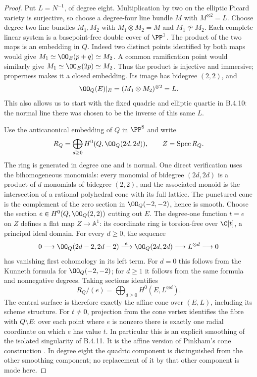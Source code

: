 \begin{proof}
Put $L=N^{-1}$, of degree eight.  Multiplication by two on the
elliptic Picard variety is surjective, so choose a degree-four
line bundle $M$ with $M^{\otimes2}=L$.
Choose degree-two line bundles $M_1,M_2$ with
$M_1\otimes M_2=M$ and $M_1\not\simeq M_2$.
Each complete linear system is a basepoint-free double cover of
$\PP^1$.  The product of the two maps is an embedding in $Q$.
Indeed two distinct points identified by both maps would give
$M_1\simeq\OO_E(p+q)\simeq M_2$.
A common ramification point would similarly give
$M_1\simeq\OO_E(2p)\simeq M_2$.
Thus the product is injective and immersive; properness makes it a
closed embedding.  Its image has bidegree $(2,2)$, and
\[
 \OO_Q(E)|_E=(M_1\otimes M_2)^{\otimes2}=L.
\]
This also allows us to start with the fixed quadric and elliptic
quartic in B.4.10: the normal line there was chosen to be the
inverse of this same $L$.

Use the anticanonical embedding of $Q$ in $\PP^8$ and write
\[
 R_Q=\bigoplus_{d\ge0}H^0(Q,\OO_Q(2d,2d)),\qquad
 Z=\operatorname{Spec}R_Q.
\]
The ring is generated in degree one and is normal.
One direct verification uses the bihomogeneous monomials:
every monomial of bidegree $(2d,2d)$ is a product of $d$
monomials of bidegree $(2,2)$, and the associated monoid is the
intersection of a rational polyhedral cone with its full lattice.
The punctured cone is the complement of the zero section in
$\OO_Q(-2,-2)$, hence is smooth.
Choose the section $e\in H^0(Q,\OO_Q(2,2))$ cutting out $E$.
The degree-one function $t=e$ on $Z$ defines a flat map
$Z\to\mathbb A^1$: its coordinate ring is torsion-free over
$\C[t]$, a principal ideal domain.
For every $d\ge0$, the sequence
\[
 0\longrightarrow\OO_Q(2d-2,2d-2)
 \xrightarrow{\ e\ }\OO_Q(2d,2d)
 \longrightarrow L^{\otimes d}\longrightarrow0
\]
has vanishing first cohomology in its left term.
For $d=0$ this follows from the Kunneth formula for
$\OO_Q(-2,-2)$; for $d\ge1$ it follows from the same formula
and nonnegative degrees.
Taking sections identifies
\[
 R_Q/(e)=\bigoplus_{d\ge0}H^0(E,L^{\otimes d}).
\]
The central surface is therefore exactly the affine cone over
$(E,L)$, including its scheme structure.
For $t\ne0$, projection from the cone vertex identifies the
fibre with $Q\setminus E$: over each point where $e$ is nonzero
there is exactly one radial coordinate on which $e$ has value $t$.
In particular this is an explicit smoothing of the isolated
singularity of B.4.11.
It is the affine version of Pinkham's cone construction
\citep[Remark~7.6(iii), p.~46; Section~9, pp.~63--65]{Pinkham1974Root}.
In degree eight the quadric component is distinguished from the
other smoothing component; no replacement of it by that other
component is made here.


\end{proof}
